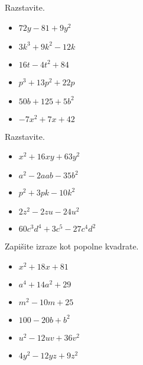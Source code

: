 \begin{multicols}{2}
    
        
            \begin{naloga}
                Razstavite.
                \begin{itemize}
                    \item $72y-81+9y^2$ 
                    \item $3k^3+9k^2-12k$ 
                    \item $16t-4t^2+84$ 
                    \item $p^3+13p^2+22p$ 
                    \item $50b+125+5b^2$ 
                    \item $-7x^2+7x+42$ 
                \end{itemize}
            \end{naloga}
        
    
        
            \begin{naloga}
                Razstavite.
                \begin{itemize}
                    \item $x^2+16xy+63y^2$ 
                    \item $a^2-2aab-35b^2$ 
                    \item $p^2+3pk-10k^2$ 
                    \item $2z^2-2zu-24u^2$ 
                    \item $60c^3d^4+3c^5-27c^4d^2$ 
                \end{itemize}
            \end{naloga}
        
    
        
            \begin{naloga}
                Zapišite izraze kot popolne kvadrate.
                \begin{itemize}
                    \item $x^2+18x+81$ 
                    \item $a^4+14a^2+29$ 
                    \item $m^2-10m+25$ 
                    \item $100-20b+b^2$ 
                    \item $u^2-12uv+36v^2$ 
                    \item $4y^2-12yz+9z^2$ 
                \end{itemize}
            \end{naloga}
        

\end{multicols}
